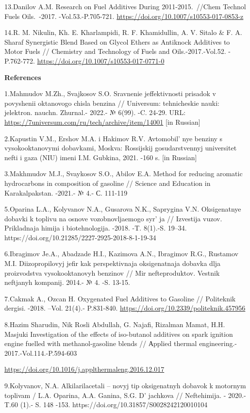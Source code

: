 13.Danilov A.M. Research on Fuel Additives During 2011-2015.~//Chem
Technol Fuels Oils.~-2017. -Vol.53.-P.705-721.
\url{https://doi.org/10.1007/s10553-017-0853-z}

14.R. M. Nikulin, Kh. E. Kharlampidi, R. F. Khamidullin, A. V. Sitalo \&
F. A. Sharaf Synergistic Blend Based on Glycol Ethers as Antiknock
Additives to Motor Fuels // Chemistry and Technology of Fuels and
Oils.-2017.-Vol.52. - P.762-772.
\url{https://doi.org/10.1007/s10553-017-0771-0}

{\bfseries References}

1.Mahmudov M.Zh., Svajkosov S.O. Sravnenie jeffektivnosti prisadok v
povyshenii oktanovogo chisla benzina // Universum: tehnicheskie nauki:
jelektron. nauchn. Zhurnal.- 2022.- № 6(99). -C. 24-29. URL:
\url{https://7universum.com/ru/tech/archive/item/14001} {[}in Russian{]}

2.Kapustin V.M., Ershov M.A. i Hakimov R.V.
Avtomobil' nye benziny s vysokooktanovymi dobavkami,
Moskva: Rossijskij gosudarstvennyj universitet nefti i gaza (NIU) imeni
I.M. Gubkina, 2021. -160 s. {[}in Russian{]}

3.Makhmudov M.J., Svaykosov S.O., Abilov E.A. Method for reducing
aromatic hydrocarbons in composition of gasoline // Science and
Education in Karakalpakstan. -2021.- № 4.- С. 111-119

5.Oparina L.A., Kolyvanov N.A., Gusarova N.K., Saprygina V.N.
Oksigenatnye dobavki k toplivu na osnove vozobnovljaemogo
syr' ja // Izvestija vuzov. Prikladnaja himija i
biotehnologija. -2018. -T. 8(1).-S. 19--34.
https://doi.org/10.21285/2227-2925-2018-8-1-19-34

6.Ibragimov Je.A., Abadzade H.I., Kazimova A.N., Ibragimov R.G.,
Rustamov M.I. Diizopropilovyj jefir kak perspektivnaja oksigenatnaja
dobavka dlja proizvodstva vysokooktanovyh benzinov // Mir
nefteproduktov. Vestnik neftjanyh kompanij. 2014.- № 4. -S. 13-15.

7.Cakmak A., Ozcan H. Oxygenated Fuel Additives to Gasoline //
Politeknik dergisi. -2018. --Vol. 21(4).- P.831-840.
\url{https://doi.org/10.2339/politeknik.457956}

8.Hazim Sharudin, Nik Rosli Abdullah, G. Najafi, Rizalman Mamat, H.H.
Masjuki Investigation of the effects of iso-butanol additives on spark
ignition engine fuelled with methanol-gasoline blends // Аpplied thermal
engineering.- 2017.-Vol.114.-P.594-603

\url{https://doi.org/10.1016/j.applthermaleng.2016.12.017}

9.Kolyvanov, N.A. Alkilarilacetali -- novyj tip oksigenatnyh dobavok k
motornym toplivam / L.A. Oparina, A.A. Ganina, S.G.
D' jachkova // Neftehimija. - 2020.- T.60 (1).- S. 148
-153. https://doi.org/10.31857/S0028242120010104

